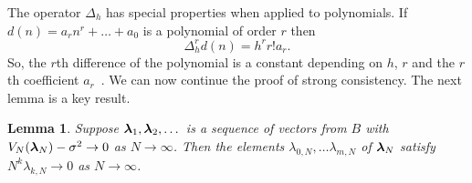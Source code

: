 \documentclass[aap,preprint]{imsart}
\newtheorem{lemma}{Lemma}
\begin{document}
The operator $\Delta_h$ has special properties when applied to polynomials. If $d(n) = a_r n^r + \dots + a_0$ is a polynomial of order $r$ then
 \begin{equation} \label{eq:mfinitediffpoly}
 \Delta_h^r d(n) = h^r r! a_r. 
 \end{equation}
So, the $r$th difference of the polynomial is a constant depending on $h$, $r$ and the $r$th coefficient $a_r$~\cite[page 51]{Jordan_Calculus_of_finite_difference_1965}.  We can now continue the proof of strong consistency.  The next lemma is a key result.

\begin{lemma}\label{lem:moran2}
Suppose $\boldsymbol{\lambda}_1, \boldsymbol{\lambda}_2,\dots$ is a sequence of vectors from $B$ with $V_N(\boldsymbol{\lambda}_N) - \sigma^2\rightarrow 0$ as $N\rightarrow\infty$. Then the elements $\lambda_{0,N}, \dots \lambda_{m,N}$ of $\boldsymbol{\lambda}_N$ satisfy $N^k\lambda_{k, N}\rightarrow0$ as $N\rightarrow\infty$.
\end{lemma}
\end{document}
